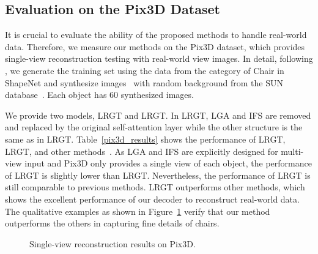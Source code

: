 \documentclass[10pt,twocolumn,letterpaper]{article}
\begin{document}
\begin{table}[]
\centering
\renewcommand\arraystretch{1.1}
\caption{Comparison of single-view object reconstruction results on Pix3D using IoU and F-score@.  means the original transformer blocks replace the LGA transformer blocks in LRGT and other structures are consistent with LRGT.}
\label{pix3d_results}
\end{table}

\subsection{Evaluation on the Pix3D Dataset}
It is crucial to evaluate the ability of the proposed methods to handle real-world data. Therefore, we measure our methods on the Pix3D dataset, which provides single-view reconstruction testing with real-world view images. In detail, following \cite{xie2019pix2vox,xie2020pix2vox++}, we generate the training set using the data from the category of Chair in ShapeNet and synthesize images~\cite{su2015render} with random background from the SUN database~\cite{xiao2010sun}. Each object has 60 synthesized images.

We provide two models, LRGT and LRGT. In LRGT, LGA and IFS are removed and replaced by the original self-attention layer while the other structure is the same as in LRGT. Table~\ref{pix3d_results} shows the performance of LRGT, LRGT, and other methods~\cite{xie2020pix2vox++, shi20213d, zhu2023garnet, zhu2023umi}. As LGA and IFS are explicitly designed for multi-view input and Pix3D only provides a single view of each object, the performance of LRGT is slightly lower than LRGT. Nevertheless, the performance of LRGT is still comparable to previous methods. LRGT outperforms other methods, which shows the excellent performance of our decoder to reconstruct real-world data. The qualitative examples as shown in Figure~\ref{show_results_pix3d} verify that our method outperforms the others in capturing fine details of chairs.
\begin{figure}[ht]
	\centering
	\caption{Single-view reconstruction results on Pix3D.}
	\label{show_results_pix3d}
\end{figure}
\end{document}
